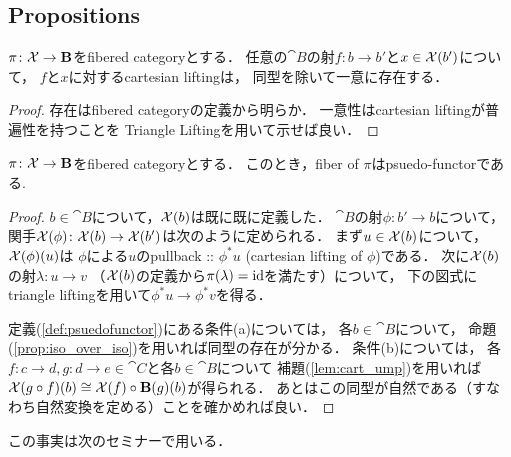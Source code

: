 \documentclass[a4paper, dvipdfmx]{jsarticle}
\begin{document}
\subsection{Propositions}
\begin{Lemma} \label{lem:cart_ump}
    $\pi \colon \mathcal{X} \to \mathbf{B}$をfibered categoryとする．
    任意の$\cat{B}$の射$f \colon b \to b'$と$x \in \mathcal{X}(b')$について，
    $f$と$x$に対するcartesian liftingは，
    同型を除いて一意に存在する．
\end{Lemma}
\begin{proof}
    存在はfibered categoryの定義から明らか．
    一意性はcartesian liftingが普遍性を持つことを
    Triangle Liftingを用いて示せば良い．
\end{proof}

\begin{Lemma}
    $\pi \colon \mathcal{X} \to \mathbf{B}$をfibered categoryとする．
    このとき，fiber of $\pi$はpsuedo-functorである.
\end{Lemma}
\begin{proof}
    $b \in \cat{B}$について，$\mathcal{X}(b)$は既に既に定義した．
    $\cat{B}$の射$\phi \colon b' \to b$について，
    関手$\mathcal{X}(\phi) \colon \mathcal{X}(b) \to \mathcal{X}(b')$は次のように定められる．
    まず$u \in \mathcal{X}(b)$について，
    $\mathcal{X}(\phi)(u)$は
    $\phi$による$u$のpullback :: $\phi^* u$ (cartesian lifting of $\phi$)である．
    次に$\mathcal{X}(b)$の射$\lambda \colon u \to v$
    （$\mathcal{X}(b)$の定義から$\pi(\lambda)=\mathrm{id}_{\!}$を満たす）について，
    下の図式にtriangle liftingを用いて$\phi^*u \to \phi^*v$を得る．
    \begin{center}
    \end{center}

    定義(\ref{def:psuedofunctor})にある条件(a)については，
    各$b \in \cat{B}$について，
    命題(\ref{prop:iso_over_iso})を用いれば同型の存在が分かる．
    条件(b)については，
    各$f \colon c \to d, g \colon d \to e \in \cat{C}$と各$b \in \cat{B}$について
    補題(\ref{lem:cart_ump})を用いれば
    $\mathcal{X}(g \circ f)(b) \cong \mathcal{X}(f) \circ \mathbf{B}(g)(b)$が得られる．
    あとはこの同型が自然である（すなわち自然変換を定める）ことを確かめれば良い．
\end{proof}
この事実は次のセミナーで用いる．
\end{document}
